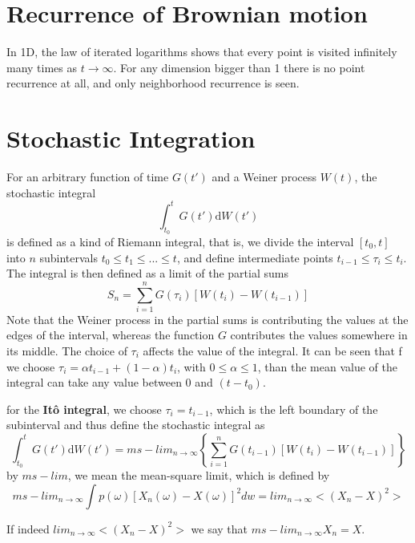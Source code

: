 \documentclass[12pt]{book}
\begin{document}
\section{Recurrence of Brownian motion}\label{section:recurrenceOfBrownianMotion}
In 1D, the law of iterated logarithms shows that every point is visited infinitely many times as $t\rightarrow \infty$. For any dimension bigger than 1 there is no point recurrence at all, and only neighborhood recurrence is seen. 


\section{Stochastic Integration}\label{section:stochasticIntegration}
For an arbitrary function of time $G(t')$ and a Weiner process $W(t)$, the stochastic integral 
\begin{equation*}
\int_{t_0}^t G(t')\mathrm{d}W(t')
\end{equation*}
is defined as a kind of Riemann integral, that is, we divide the interval $[t_0,t]$ into $n$ subintervals $t_0\leq t_1\leq ...\leq t$, and define intermediate points $t_{i-1}\leq\tau_i\leq t_{i}$. The integral is then defined as a limit of the partial sums 
\begin{equation*}
S_n=\sum_{i=1}^nG(\tau_i)[W(t_i)-W(t_{i-1})]
\end{equation*}
Note that the Weiner process in the partial sums is contributing the values at the edges of the interval, whereas the function $G$ contributes the values somewhere in its middle.
The choice of $\tau_i$ affects the value of the integral. It can be seen that f we choose $\tau_i=\alpha t_{i-1}+(1-\alpha)t_i$, with $0\leq \alpha\leq 1$,  than the mean value of the integral can take any value between 0 and $(t-t_0)$. 

for the \textbf{It\^{o} integral}, we choose $\tau_i=t_{i-1}$, which is the left boundary of the subinterval and thus define the stochastic integral as
\begin{equation*}
\int_{t_0}^{t}G(t')\mathrm{d}W(t')=ms-lim_{n\rightarrow\infty}\left\{\sum_{i=1}^nG(t_{i-1})[W(t_{i})-W(t_{i-1})] \right\}
\end{equation*}
by $ms-lim$, we mean the mean-square limit, which is defined by 
\begin{equation*}
ms-lim_{n\rightarrow\infty}\int p(\omega)[X_n(\omega)-X(\omega)]^2dw= lim_{n\rightarrow \infty}<(X_n-X)^2>
\end{equation*}

If indeed $lim_{n\rightarrow \infty}<(X_n-X)^2>$ we say that $ms-lim_{n\rightarrow \infty} X_n=X$.
\end{document}
